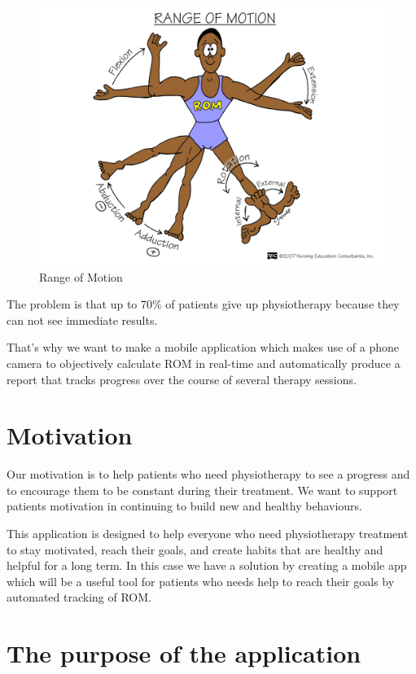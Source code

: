 \documentclass[runningheads,a4paper,11pt]{report}
\begin{document}
\begin{figure}[htbp]
	\centerline{\includegraphics[scale=0.25]{fig/rangeofmotion.png}}  
	\caption{Range of Motion}
\end{figure}

\par The problem is that up to 70\% of patients give up physiotherapy because they can not see immediate results.
\par That's why we want to make a mobile application which makes use of a phone camera to objectively calculate ROM in real-time and automatically produce a report that tracks progress over the course of several therapy sessions.

\section{Motivation}
\par Our motivation is to help patients who need physiotherapy to see a progress and to encourage them to be constant during their treatment. We want to support patients motivation in continuing to build new and healthy behaviours. 
\par This application is designed to help everyone who need physiotherapy treatment to stay motivated, reach their goals, and create habits that are healthy and helpful for a long term. In this case we have a solution by creating a mobile app which will be a useful tool for patients who needs help to reach their goals by automated tracking of ROM.

\section{The purpose of the application}
\end{document}
